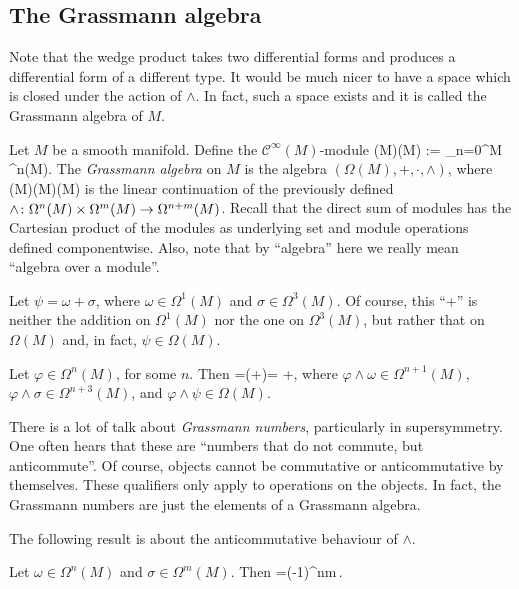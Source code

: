 \subsection{The Grassmann algebra}

Note that the wedge product takes two differential forms and produces a differential form of a different type. It would be much nicer to have a space which is closed under the action of $\wedge$. In fact, such a space exists and it is called the Grassmann algebra of $M$.

\bd
Let $M$ be a smooth manifold. Define the $\mathcal{C}^\infty(M)$-module
\bse
\Gr(M)\equiv\Omega(M) := \bigoplus_{n=0}^{\dim M} \Omega^n(M).
\ese
The \emph{Grassmann algebra} on $M$ is the algebra $(\Omega(M),+,\cdot,\wedge)$, where
\bse
\wedge\cl \Omega(M)\times\Omega(M)\to\Omega(M)
\ese
is the linear continuation of the previously defined $\wedge\colon\Omega^n(M)\times\Omega^m(M)\to\Omega^{n+m}(M)$.
\ed
Recall that the direct sum of modules has the Cartesian product of the modules as underlying set and module operations defined componentwise. Also, note that by ``algebra'' here we really mean ``algebra over a module''.

\be
Let $\psi=\omega+\sigma$, where $\omega\in\Omega^1(M)$ and $\sigma\in\Omega^3(M)$. Of course, this ``+'' is neither the addition on $\Omega^1(M)$ nor the one on $\Omega^3(M)$, but rather that on $\Omega(M)$ and, in fact, $\psi\in\Omega(M)$. 

Let $\varphi\in \Omega^n(M)$, for some $n$. Then
\bse
\varphi\wedge\psi=\varphi\wedge(\omega+\sigma)= \varphi\wedge\omega+\varphi\wedge\sigma,
\ese
where $\varphi\wedge\omega\in\Omega^{n+1}(M)$, $\varphi\wedge\sigma\in\Omega^{n+3}(M)$, and $\varphi\wedge\psi\in\Omega(M)$.
\ee

\be
There is a lot of talk about \emph{Grassmann numbers}, particularly in supersymmetry. One often hears that these are ``numbers that do not commute, but anticommute''. Of course, objects cannot be commutative or anticommutative by themselves. These qualifiers only apply to operations on the objects.
In fact, the Grassmann numbers are just the elements of a Grassmann algebra. 
\ee

The following result is about the anticommutative behaviour of $\wedge$. 

\begin{theorem}
Let $\omega\in\Omega^n(M)$ and $\sigma\in\Omega^m(M)$. Then
\bse
\omega\wedge\sigma=(-1)^{nm}\,\sigma\wedge\omega.
\ese
\end{theorem}

